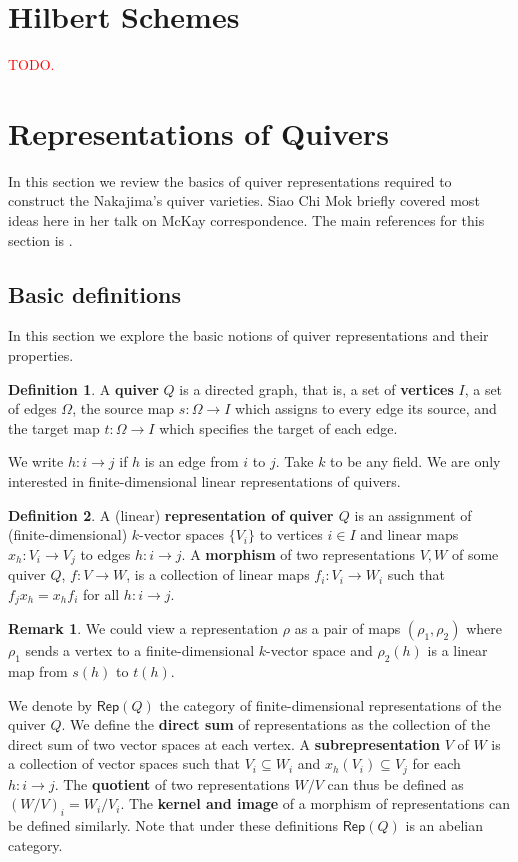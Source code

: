 \documentclass[12pt]{report}
\theoremstyle{remark}
\theoremstyle{definition}
\newtheorem{remark}{Remark}[section]
\newtheorem{definition}{Definition}[section]
\newcommand{\Rep}[0]{\mathsf{Rep}}
\begin{document}
    \section{Hilbert Schemes}
    \textcolor{red}{TODO.}

    \section{Representations of Quivers}
    In this section we review the basics of quiver representations required to construct the Nakajima's quiver varieties. Siao Chi Mok briefly covered most ideas here in her talk on McKay correspondence. The main references for this section is \cite{kirillov_2016_quiver}.
    \subsection{Basic definitions}
    In this section we explore the basic notions of quiver representations and their properties.
    \begin{definition}\label{def-quiver}
        A \textbf{quiver} $Q$ is a directed graph, that is, a set of \textbf{vertices} $I$, a set of edges $\Omega$, the source map $s:\Omega\to I$ which assigns to every edge its source, and the target map $t:\Omega \to I$ which specifies the target of each edge.
    \end{definition}
    We write $h:i\to j$ if $h$ is an edge from $i$ to $j$. Take $k$ to be any field. We are only interested in finite-dimensional linear representations of quivers.
    \begin{definition}
        A (linear) \textbf{representation of quiver $Q$} is an assignment of (finite-dimensional) $k$-vector spaces $\{V_i\}$ to vertices $i\in I$ and linear maps $x_h:V_i\to V_j$ to edges $h:i\to j$. A \textbf{morphism} of two representations $V, W$ of some quiver $Q$, $f:V\to W$, is a collection of linear maps $f_i:V_i\to W_i$ such that $f_jx_h=x_hf_i$ for all $h:i\to j$.
    \end{definition}
    \begin{remark}
        We could view a representation $\rho$ as a pair of maps $(\rho_1,\rho_2)$ where $\rho_1$ sends a vertex to a finite-dimensional $k$-vector space and $\rho_2(h)$ is a linear map from $s(h)$ to $t(h)$.
    \end{remark}
    We denote by $\Rep(Q)$ the category of finite-dimensional representations of the quiver $Q$. We define the \textbf{direct sum} of representations as the collection of the direct sum of two vector spaces at each vertex. A \textbf{subrepresentation} $V$ of $W$ is a collection of vector spaces such that $V_i\subseteq W_i$ and $x_h(V_i)\subseteq V_j$ for each $h:i\to j$. The \textbf{quotient} of two representations $W/V$ can thus be defined as $(W/V)_i=W_i/V_i$. The \textbf{kernel and image} of a morphism of representations can be defined similarly. Note that under these definitions $\Rep(Q)$ is an abelian category.
\end{document}

